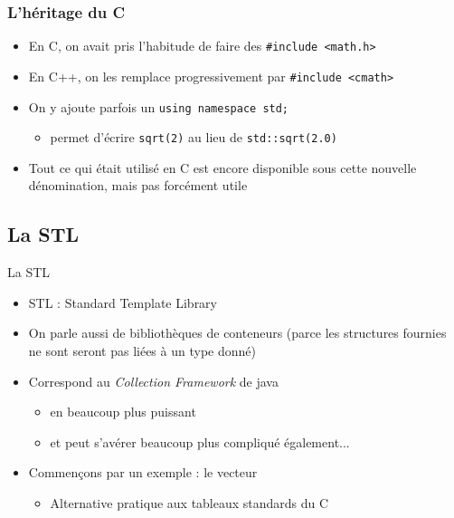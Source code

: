 \begin{frame}[fragile]\frametitle{L'héritage du C}
\begin{itemize}
\item En C, on avait pris l'habitude de faire des \verb|#include <math.h>|
\item En C++, on les remplace progressivement par \verb|#include <cmath>|
\item On y ajoute parfois un \verb|using namespace std;|
\begin{itemize}
\item permet d'écrire \verb|sqrt(2)| au lieu de \verb|std::sqrt(2.0)|
\end{itemize}
\item Tout ce qui était utilisé en C est encore disponible sous cette nouvelle dénomination, mais pas forcément utile
\end{itemize}
\end{frame}

\subsection{La STL}

\begin{frame}{La STL}
\begin{itemize}
\item STL : Standard Template Library
\item On parle aussi de bibliothèques de conteneurs (parce les structures fournies ne sont seront pas liées à un type donné)
\item Correspond au \textit{Collection Framework} de java
\begin{itemize}
\item en beaucoup plus puissant
\item et peut s'avérer beaucoup plus compliqué également...
\end{itemize}
\item Commençons par un exemple : le vecteur
\begin{itemize}
\item Alternative pratique aux tableaux standards du C
\end{itemize}
\end{itemize}
\end{frame}

